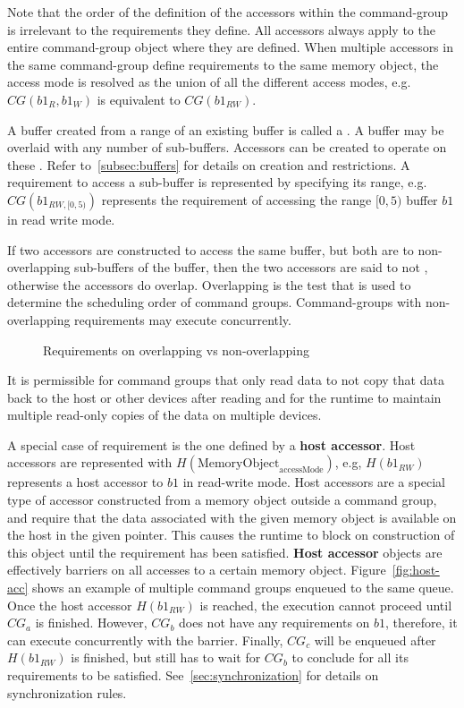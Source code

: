 Note that the order of the definition of the accessors within the 
\gls{command-group} is irrelevant to the requirements they define.
All accessors always apply to the entire \gls{command-group} object where
they are defined.
When multiple \glspl{accessor} in the same \gls{command-group} define requirements to the same memory object, the access mode is resolved as the union of
all the different access modes, e.g. $CG(b1_{R},b1_{W})$ is equivalent
to $CG(b1_{RW})$.

A buffer created from a range of an existing buffer is called
a .
A buffer may be overlaid with any number of sub-buffers.
Accessors can be created to operate on these . 
Refer to~\ref{subsec:buffers} for details on  
creation and restrictions.
A requirement to access a sub-buffer is represented by specifying its
range, e.g. $CG(b1_{RW,[0,5)})$ represents the requirement of accessing
the range $[0,5)$ buffer $b1$ in read write mode.

If two accessors are constructed to
access the same buffer, but both are to non-overlapping sub-buffers of the
buffer, then the two accessors are said to not , otherwise the
accessors do overlap. Overlapping is the test that is used to determine the
scheduling order of command groups. 
Command-groups with non-overlapping requirements may execute concurrently.

\begin{figure}[h]
\centering

\caption{Requirements on overlapping vs non-overlapping }
\label{fig:overlap}
\end{figure}

It is permissible for command groups that only read data to not copy that data
back to the host or other devices after reading and for the runtime to maintain
multiple read-only copies of the data on multiple devices.

A special case of requirement is the one defined by a \textbf{host accessor}.
Host accessors are represented with $H(\text{MemoryObject}_{\text{accessMode}})$, e.g,
$H(b1_{RW})$ represents a host accessor to $b1$ in read-write mode.
Host accessors are a special type of accessor constructed from a memory
object outside a command group, and require that the data associated with
the given memory object is available on the host in the given pointer.
This causes the runtime to block on construction of this object until the
requirement has been satisfied. 
\textbf{Host accessor} objects are effectively barriers on all accesses to 
a certain memory object.
Figure~\ref{fig:host-acc} shows an example of multiple command groups
enqueued to the same queue. Once the host accessor $H(b1_{RW})$ is reached,
the execution cannot proceed until $CG_a$ is finished. 
However, $CG_b$ does not have any requirements on $b1$, therefore, it can
execute concurrently with the barrier.
Finally, $CG_c$ will be enqueued after $H(b1_{RW})$ is finished, 
but still has to wait for $CG_b$ to conclude for all its requirements to
be satisfied.
See~\ref{sec:synchronization} for details on synchronization rules.

